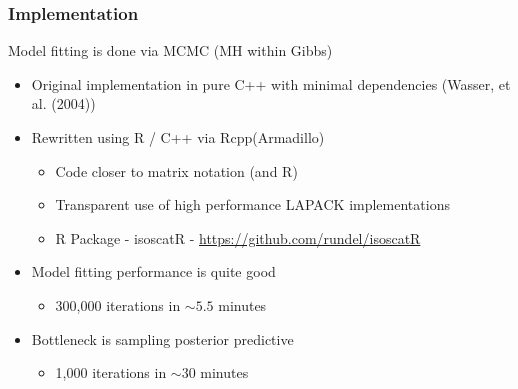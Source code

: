 \documentclass[t]{beamer}\usepackage[]{graphicx}\usepackage[]{color}
\begin{document}
\begin{frame}
\frametitle{Implementation}

Model fitting is done via MCMC (MH within Gibbs) \\
\begin{itemize} \addtolength{\itemsep}{3mm}
\item Original implementation in pure C++ with minimal dependencies (Wasser, et al. (2004))
\item Rewritten using R / C++ via Rcpp(Armadillo) 
\begin{itemize}
\item Code closer to matrix notation (and R)
\item Transparent use of high performance LAPACK implementations
\item R Package - isoscatR - \url{https://github.com/rundel/isoscatR}
\end{itemize}
\item Model fitting performance is quite good
\begin{itemize}
  \item 300,000 iterations in $\sim 5.5$ minutes
\end{itemize}
\item Bottleneck is sampling posterior predictive
\begin{itemize}
  \item1,000 iterations in $\sim 30$ minutes
\end{itemize}
\end{itemize}

\end{frame}

\end{document}
